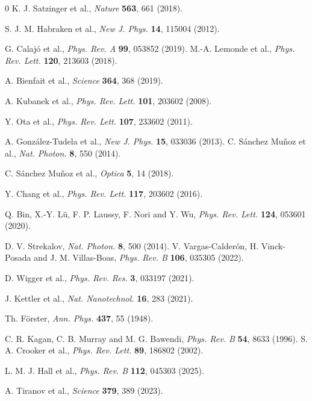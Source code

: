 \documentclass{ws-ijmpb}
\begin{document}
\begin{thebibliography}{0}
	K. J. Satzinger et al., {\it Nature} {\bf563}, 661 (2018).
	
	S. J. M. Habraken et al., {\it New J. Phys.} {\bf14}, 115004 (2012).
	
	G. Calaj\'o et al., {\it Phys. Rev. A} {\bf99}, 053852 (2019).
	M.-A. Lemonde et al., {\it Phys. Rev. Lett.} {\bf120}, 213603 (2018).
	
	A. Bienfait et al., {\it Science} {\bf364}, 368 (2019).
	
	A. Kubanek et al., {\it Phys. Rev. Lett.} {\bf101}, 203602 (2008).
	
	Y. Ota et al., {\it Phys. Rev. Lett.} {\bf107}, 233602 (2011).
	
	A. Gonz\'alez-Tudela et al., {\it New J. Phys.} {\bf15}, 033036 (2013).
	C. S\'anchez Mu\~noz et al., {\it Nat. Photon.} {\bf8}, 550 (2014).
	
	C. S\'anchez Mu\~noz et al., {\it Optica} {\bf5}, 14 (2018).
	
	Y. Chang et al., {\it Phys. Rev. Lett.} {\bf117}, 203602 (2016).
	
	Q. Bin, X.-Y. L\"u, F. P. Laussy, F. Nori and Y. Wu, {\it Phys. Rev. Lett.} {\bf124}, 053601 (2020).
	
	D. V. Strekalov, {\it Nat. Photon.} {\bf8}, 500 (2014).
	V. Vargas-Calder\'on, H. Vinck-Posada and J. M. Villas-Boas, {\it Phys. Rev. B} {\bf106}, 035305 (2022).
	
	D. Wigger et al., {\it Phys. Rev. Res.} {\bf3}, 033197 (2021).
	
	J. Kettler et al., {\it Nat. Nanotechnol.} {\bf16}, 283 (2021).
	
	Th. F\"orster, {\it Ann. Phys.} {\bf437}, 55 (1948).
	
	C. R. Kagan, C. B. Murray and M. G. Bawendi, {\it Phys. Rev. B} {\bf54}, 8633 (1996).
	S. A. Crooker et al., {\it Phys. Rev. Lett.} {\bf89}, 186802 (2002).
	
	L. M. J. Hall et al., {\it Phys. Rev. B} {\bf112}, 045303 (2025).
	
	A. Tiranov et al., {\it Science} {\bf379}, 389 (2023).
	

\end{thebibliography}
\end{document}
